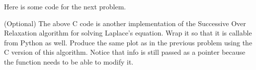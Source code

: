 Here is some code for the next problem.

\begin{problem}
(Optional)
The above C code is another implementation of the Successive Over Relaxation algorithm for solving Laplace's equation.
Wrap it so that it is callable from Python as well.
Produce the same plot as in the previous problem using the C version of this algorithm.
Notice that info is still passed as a pointer because the function needs to be able to modify it.
\end{problem}

\let\of\undefined